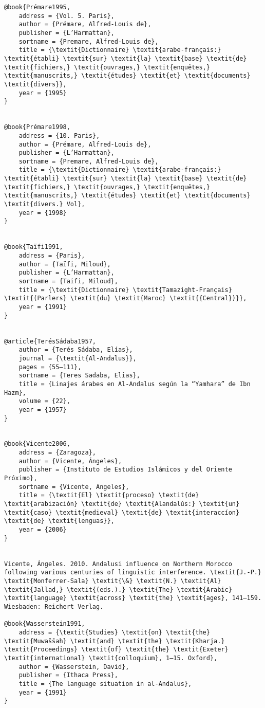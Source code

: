 \documentclass[output=paper,modfonts,nonflat]{langsci/langscibook}
\begin{document}
\begin{verbatim}
@book{Prémare1995,
	address = {Vol. 5. Paris},
	author = {Prémare, Alfred-Louis de},
	publisher = {L’Harmattan},
	sortname = {Premare, Alfred-Louis de},
	title = {\textit{Dictionnaire} \textit{arabe-français:} \textit{établi} \textit{sur} \textit{la} \textit{base} \textit{de} \textit{fichiers,} \textit{ouvrages,} \textit{enquêtes,} \textit{manuscrits,} \textit{études} \textit{et} \textit{documents} \textit{divers}},
	year = {1995}
}


@book{Prémare1998,
	address = {10. Paris},
	author = {Prémare, Alfred-Louis de},
	publisher = {L’Harmattan},
	sortname = {Premare, Alfred-Louis de},
	title = {\textit{Dictionnaire} \textit{arabe-français:} \textit{établi} \textit{sur} \textit{la} \textit{base} \textit{de} \textit{fichiers,} \textit{ouvrages,} \textit{enquêtes,} \textit{manuscrits,} \textit{études} \textit{et} \textit{documents} \textit{divers.} Vol},
	year = {1998}
}


@book{Taïfi1991,
	address = {Paris},
	author = {Taïfi, Miloud},
	publisher = {L’Harmattan},
	sortname = {Taifi, Miloud},
	title = {\textit{Dictionnaire} \textit{Tamazight-Français} \textit{(Parlers} \textit{du} \textit{Maroc} \textit{{Central})}},
	year = {1991}
}


@article{TerésSádaba1957,
	author = {Terés Sádaba, Elías},
	journal = {\textit{Al-Andalus}},
	pages = {55–111},
	sortname = {Teres Sadaba, Elias},
	title = {Linajes árabes en Al-Andalus según la “Yamhara” de Ibn Hazm},
	volume = {22},
	year = {1957}
}


@book{Vicente2006,
	address = {Zaragoza},
	author = {Vicente, Ángeles},
	publisher = {Instituto de Estudios Islámicos y del Oriente Próximo},
	sortname = {Vicente, Angeles},
	title = {\textit{El} \textit{proceso} \textit{de} \textit{arabización} \textit{de} \textit{Alandalús:} \textit{un} \textit{caso} \textit{medieval} \textit{de} \textit{interaccíon} \textit{de} \textit{lenguas}},
	year = {2006}
}


Vicente, Ángeles. 2010. Andalusi influence on Northern Morocco following various centuries of linguistic interference. \textit{J.-P.} \textit{Monferrer-Sala} \textit{\&} \textit{N.} \textit{Al} \textit{Jallad,} \textit{(eds.).} \textit{The} \textit{Arabic} \textit{language} \textit{across} \textit{the} \textit{ages}, 141–159. Wiesbaden: Reichert Verlag.

@book{Wasserstein1991,
	address = {\textit{Studies} \textit{on} \textit{the} \textit{Muwaššah} \textit{and} \textit{the} \textit{Kharja.} \textit{Proceedings} \textit{of} \textit{the} \textit{Exeter} \textit{international} \textit{colloquium}, 1–15. Oxford},
	author = {Wasserstein, David},
	publisher = {Ithaca Press},
	title = {The language situation in al-Andalus},
	year = {1991}
}


\end{verbatim}
\sloppy\printbibliography[heading=subbibliography,notkeyword=this]
\end{document}

